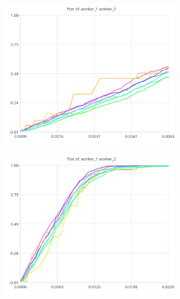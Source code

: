 \begin{figure}[H]
            \centering
            \begin{subfigure}{.5\textwidth}
                \centering
                \includegraphics[width=0.98\textwidth]{img/w1w2.png}
                \label{fig:w1w2}
            \end{subfigure}%
            \begin{subfigure}{.5\textwidth}
                \centering
                \includegraphics[width =0.98\textwidth]{img/w1w2hb.png}
                \label{fig:sub2}
            \end{subfigure}
            \label{fig:w1w2hb}
            \end{figure}

